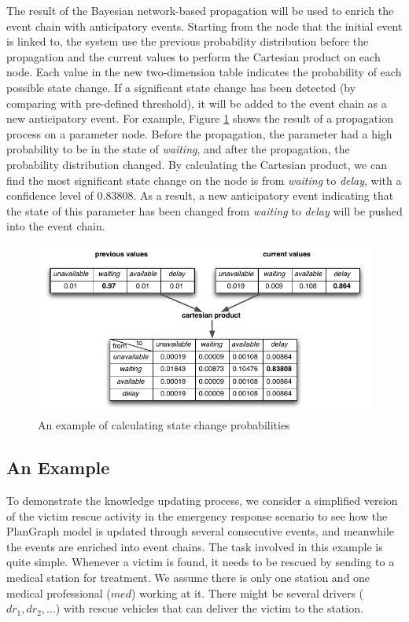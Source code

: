 The result of the Bayesian network-based propagation will be used to enrich the event chain with anticipatory events. Starting from the node that the initial event is linked to, the system use the previous probability distribution before the propagation and the current values to perform the Cartesian product on each node. Each value in the new two-dimension table indicates the probability of each possible state change. If a significant state change has been detected (by comparing with pre-defined threshold), it will be added to the event chain as a new anticipatory event. For example, Figure \ref{fig:prob_state_change} shows the result of a propagation process on a parameter node. Before the propagation, the parameter had a high probability to be in the state of \emph{waiting}, and after the propagation, the probability distribution changed. By calculating the Cartesian product, we can find the most significant state change on the node is from \emph{waiting} to \emph{delay}, with a confidence level of $0.83808$. As a result, a new anticipatory event indicating that the state of this parameter has been changed from \emph{waiting} to \emph{delay} will be pushed into the event chain.
\begin{figure}[htbp] %
	\centering
	\includegraphics{prob_state_change.pdf} 
	\caption{An example of calculating state change probabilities}
	\label{fig:prob_state_change}
\end{figure}
\subsection{An Example} %
\label{sub:an_example}
To demonstrate the knowledge updating process, we consider a simplified version of the victim rescue activity in the emergency response scenario to see how the PlanGraph model is updated through several consecutive events, and meanwhile the events are enriched into event chains. The task involved in this example is quite simple. Whenever a victim is found, it needs to be rescued by sending to a medical station for treatment. We assume there is only one station and one medical professional ($med$) working at it. There might be several drivers ($dr_1, dr_2, ...$) with rescue vehicles that can deliver the victim to the station.   

